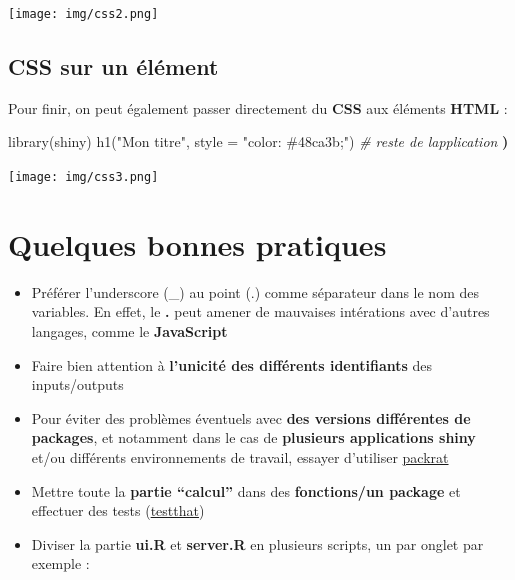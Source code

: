 \documentclass[
]{article}
\newenvironment{Shaded}{\begin{snugshade}}{\end{snugshade}}
\newcommand{\AttributeTok}[1]{\textcolor[rgb]{0.77,0.63,0.00}{#1}}
\newcommand{\CommentTok}[1]{\textcolor[rgb]{0.56,0.35,0.01}{\textit{#1}}}
\newcommand{\ErrorTok}[1]{\textcolor[rgb]{0.64,0.00,0.00}{\textbf{#1}}}
\newcommand{\FunctionTok}[1]{\textcolor[rgb]{0.00,0.00,0.00}{#1}}
\newcommand{\NormalTok}[1]{#1}
\newcommand{\SpecialCharTok}[1]{\textcolor[rgb]{0.00,0.00,0.00}{#1}}
\newcommand{\StringTok}[1]{\textcolor[rgb]{0.31,0.60,0.02}{#1}}
\providecommand{\tightlist}{%
  \setlength{\itemsep}{0pt}\setlength{\parskip}{0pt}}
\begin{document}
\begin{Shaded}
\end{Shaded}

\texttt{[image: img/css2.png]}

\hypertarget{css-sur-un-uxe9luxe9ment}{%
\subsection{CSS sur un élément}\label{css-sur-un-uxe9luxe9ment}}

Pour finir, on peut également passer directement du \textbf{CSS} aux
éléments \textbf{HTML} :

\begin{Shaded}
\begin{Highlighting}[]
\FunctionTok{library}\NormalTok{(shiny)}
\FunctionTok{h1}\NormalTok{(}\StringTok{"Mon titre"}\NormalTok{, }\AttributeTok{style =} \StringTok{"color: \#48ca3b;"}\NormalTok{)}
\CommentTok{\# reste de l\textquotesingle{}application}
\ErrorTok{)}
\end{Highlighting}
\end{Shaded}

\texttt{[image: img/css3.png]}

\hypertarget{quelques-bonnes-pratiques}{%
\section{Quelques bonnes pratiques}\label{quelques-bonnes-pratiques}}

\begin{itemize}
\tightlist
\item
  Préférer l'underscore (\_) au point (.) comme séparateur dans le nom
  des variables. En effet, le \textbf{.} peut amener de mauvaises
  intérations avec d'autres langages, comme le \textbf{JavaScript}
\item
  Faire bien attention à \textbf{l'unicité des différents identifiants}
  des inputs/outputs
\item
  Pour éviter des problèmes éventuels avec \textbf{des versions
  différentes de packages}, et notamment dans le cas de
  \textbf{plusieurs applications shiny} et/ou différents environnements
  de travail, essayer d'utiliser
  \href{https://rstudio.github.io/packrat/}{packrat}
\item
  Mettre toute la \textbf{partie ``calcul''} dans des
  \textbf{fonctions/un package} et effectuer des tests
  (\href{http://r-pkgs.had.co.nz/tests.html}{testthat})
\item
  Diviser la partie \textbf{ui.R} et \textbf{server.R} en plusieurs
  scripts, un par onglet par exemple :
\end{itemize}
\end{document}
